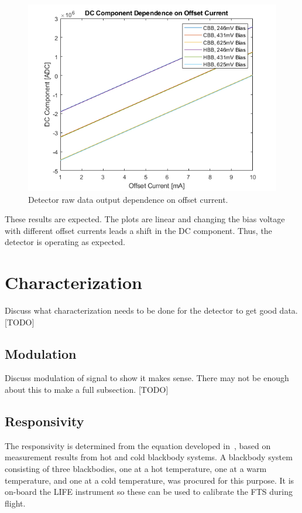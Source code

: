 \begin{figure}[h]
  \includegraphics[width=\linewidth]{chap6_images/verification/dc_component_dependence_on_offset_current.png}
  \caption{Detector raw data output dependence on offset current.}
  \label{fig:dc_dep_on_offset}
\end{figure}

These results are expected. The plots are linear and changing the bias voltage with different offset currents leads a shift in the DC component. Thus, the detector is operating as expected.

\section{Characterization}
Discuss what characterization needs to be done for the detector to get good data.
[TODO]

\subsection{Modulation}
Discuss modulation of signal to show it makes sense. There may not be enough about this to make a full subsection.
[TODO]

\subsection{Responsivity}
The responsivity is determined from the equation developed in~\citep{GLORIA_PhD}, based on measurement results from hot and cold blackbody systems. A blackbody system consisting of three blackbodies, one at a hot temperature, one at a warm temperature, and one at a cold temperature, was procured for this purpose. It is on-board the LIFE instrument so these can be used to calibrate the FTS during flight.


